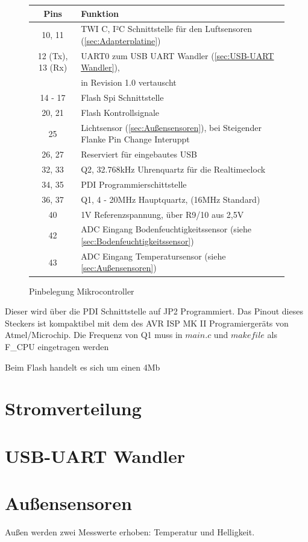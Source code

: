 \documentclass[12pt, a4paper, oneside]{report}
\begin{document}
\begin{figure}[h]
	\centering
\begin{tabular}{c|l}
	Pins & Funktion\\
	\hline
	10, 11 & TWI C, I²C Schnittstelle für den Luftsensoren 
	(\autoref{sec:Adapterplatine})\\
	12 (Tx), 13 (Rx)& UART0 zum USB UART Wandler (\autoref{sec:USB-UART Wandler}), \\&in Revision 1.0 vertauscht\\
	14 - 17 & Flash Spi Schnittstelle\\
	20, 21 & Flash Kontrollsignale\\
	25 & Lichtsensor (\autoref{sec:Außensensoren}), bei Steigender Flanke Pin Change Interuppt\\
	26, 27 & Reserviert für eingebautes USB\\
	32, 33 & Q2, 32.768kHz Uhrenquartz für die Realtimeclock\\
	34, 35 & PDI Programmierschittstelle\\
	36, 37 & Q1, 4 - 20MHz Hauptquartz, (16MHz Standard)\\
	40 & 1V Referenzspannung, über R9/10 aus 2,5V\\
	42 & ADC Eingang Bodenfeuchtigkeitssensor (siehe \autoref{sec:Bodenfeuchtigkeitssensor}) \\
	43 & ADC Eingang Temperatursensor (siehe \autoref{sec:Außensensoren})\\
\end{tabular}
	\caption{Pinbelegung Mikrocontroller}
\end{figure}
Dieser wird über die PDI Schnittstelle auf JP2 Programmiert. Das Pinout dieses Steckers ist kompaktibel mit dem des AVR ISP MK II Programiergeräts von Atmel/Microchip.
Die Frequenz von Q1 muss in $main.c$ und $makefile$ als F\_CPU eingetragen werden

Beim Flash handelt es sich um einen 4Mb 

\section{Stromverteilung}
\label{sec:Stromverteilung}

\section{USB-UART Wandler}
\label{sec:USB-UART Wandler}

\pagebreak
\section{Außensensoren}
\label{sec:Außensensoren}
Außen werden zwei Messwerte erhoben: Temperatur und Helligkeit.
\end{document}
